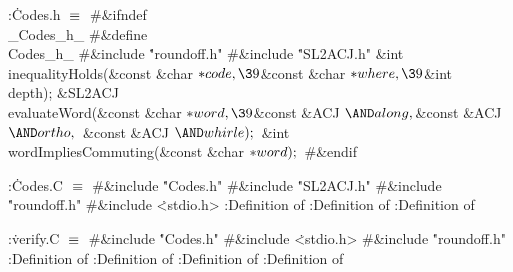 \B{}:\.{Codes.h }\X${}\equiv{}$\6
\8\#\&{ifndef} \\{\_Codes\_h\_}\6
\8\#\&{define} \\{Codes\_h\_}\6
\8\#\&{include} \.{"roundoff.h"}\6
\8\#\&{include} \.{"SL2ACJ.h"}\6
\&{int} \\{inequalityHolds}(\&{const} \&{char} ${}{*}\\{code},\39{}$\&{const} %
\&{char} ${}{*}\\{where},\39{}$\&{int} \\{depth});\6
\&{SL2ACJ} \\{evaluateWord}(\&{const} \&{char} ${}{*}\\{word},\39{}$\&{const} %
\&{ACJ} ${}{\AND}\\{along},\39{}$\&{const} \&{ACJ} ${}{\AND}\\{ortho},\39{}$%
\&{const} \&{ACJ} ${}{\AND}\\{whirle});{}$\6
\&{int} \\{wordImpliesCommuting}(\&{const} \&{char} ${}{*}\\{word});{}$\6
\8\#\&{endif}\par
\fi

\B{}:\.{Codes.C }\X${}\equiv{}$\6
\8\#\&{include} \.{"Codes.h"}\6
\8\#\&{include} \.{"SL2ACJ.h"}\6
\8\#\&{include} \.{"roundoff.h"}\6
\8\#\&{include} \.{<stdio.h>}\6
:Definition of \X\6
:Definition of \X\6
:Definition of \X\par
\fi

\B{}:\.{verify.C }\X${}\equiv{}$\6
\8\#\&{include} \.{"Codes.h"}\6
\8\#\&{include} \.{<stdio.h>}\6
\8\#\&{include} \.{"roundoff.h"}\6
:Definition of \X\6
:Definition of \X\6
:Definition of \X\6
:Definition of \X\par
\fi


\inx
\fin
\con
